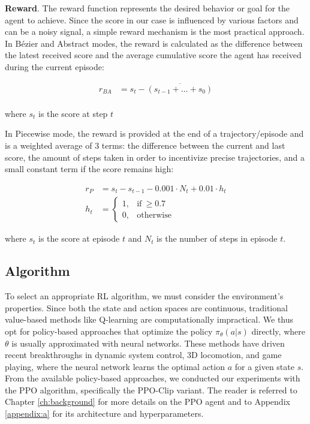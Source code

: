 \textbf{Reward}. The reward function represents the desired behavior or goal for the agent to achieve.
Since the score in our case is influenced by various factors and can be a noisy signal, a simple reward mechanism is the most practical approach.
In Bézier and Abstract modes, the reward is calculated as the difference between the latest received score and the average cumulative score the agent has received during the current episode:

\begin{equation}
\begin{aligned}
    r_{BA} &= s_t-\overline{(s_{t-1}+\dots+s_0)}\\
\end{aligned}
\label{eqn:reward}
\end{equation}

where $s_t$ is the score at step $t$

In Piecewise mode, the reward is provided at the end of a trajectory/episode and is a weighted average of 3 terms: the difference between the current and last score, the amount of steps taken in order to incentivize precise trajectories, and a small constant term if the score remains high:

\begin{equation}
\begin{aligned}
    r_P &= s_t-s_{t-1} - 0.001\cdot N_t + 0.01\cdot h_t\\
    h_t &=
    \begin{cases}
      1, & \text{if}\ \geq 0.7\\
      0, & \text{otherwise}
    \end{cases}
\end{aligned}
\label{eqn:rewre}
\end{equation}

where $s_t$ is the score at episode $t$ and $N_t$ is the number of steps in episode $t$.

\subsection{Algorithm}


To select an appropriate \gls{RL} algorithm, we must consider the environment's properties.
Since both the state and action spaces are continuous, traditional value-based methods like Q-learning are computationally impractical.
We thus opt for policy-based approaches that optimize the policy $\pi_\theta(a|s)$ directly, where $\theta$ is usually approximated with neural networks.
These methods have driven recent breakthroughs in dynamic system control, 3D locomotion, and game playing, where the neural network learns the optimal action $a$ for a given state $s$.
From the available policy-based approaches, we conducted our experiments with the \gls{PPO} algorithm, specifically the PPO-Clip variant.
The reader is referred to Chapter \ref{ch:background} for more details on the PPO agent and to Appendix \ref{appendix:a} for its architecture and hyperparameters.


